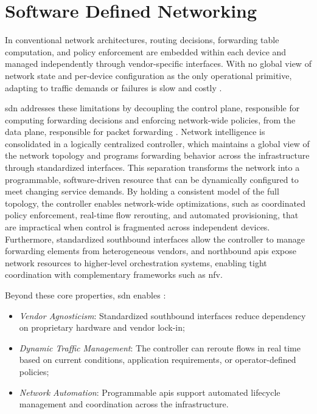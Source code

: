 \section{Software Defined Networking}

In conventional network architectures, routing decisions, forwarding table computation, and policy enforcement are embedded within each device and managed independently through vendor-specific interfaces. With no global view of network state and per-device configuration as the only operational primitive, adapting to traffic demands or failures is slow and costly \cite{ONFSoftwareDefinedNetworksNewNorm2012}.

\ac{sdn} addresses these limitations by decoupling the control plane, responsible for computing forwarding decisions and enforcing network-wide policies, from the data plane, responsible for packet forwarding \cite{dhale2025SoftwareDefinedNetworkingSDN}. Network intelligence is consolidated in a logically centralized controller, which maintains a global view of the network topology and programs forwarding behavior across the infrastructure through standardized interfaces. This separation transforms the network into a programmable, software-driven resource that can be dynamically configured to meet changing service demands. By holding a consistent model of the full topology, the controller enables network-wide optimizations, such as coordinated policy enforcement, real-time flow rerouting, and automated provisioning, that are impractical when control is fragmented across independent devices. Furthermore, standardized southbound interfaces allow the controller to manage forwarding elements from heterogeneous vendors, and northbound \acp{api} expose network resources to higher-level orchestration systems, enabling tight coordination with complementary frameworks such as \ac{nfv}.

Beyond these core properties, \ac{sdn} enables \cite{dhale2025SoftwareDefinedNetworkingSDN}:
\begin{itemize}
    \item \emph{Vendor Agnosticism}: Standardized southbound interfaces reduce dependency on proprietary hardware and vendor lock-in;
    \item \emph{Dynamic Traffic Management}: The controller can reroute flows in real time based on current conditions, application requirements, or operator-defined policies;
    \item \emph{Network Automation}: Programmable \acp{api} support automated lifecycle management and coordination across the infrastructure.
\end{itemize}

